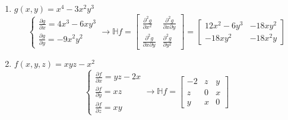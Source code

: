 \documentclass[12pt]{article}
\begin{document}
\begin{enumerate}
    \item $g(x,y) = x^4 -3x^2y^3$
    \[ \begin{cases}
        \frac{\partial g}{\partial x} = 4x^3 - 6xy^3
        \\ \frac{\partial g}{\partial y} = -9x^2y^2 
    \end{cases} \to \mathbb{H} f = \begin{bmatrix}
        \frac{\partial^2 g}{\partial x^2} & \frac{\partial^2 g}{\partial x\partial y} \\ \frac{\partial^2 g}{\partial x\partial y}& \frac{\partial^2 g}{\partial y^2}
    \end{bmatrix} = \begin{bmatrix}
        12x^2 -6y^3 & -18xy^2 \\ -18xy^2 & -18x^2y
    \end{bmatrix}
    \]
    \item $f(x,y,z) = xyz-x^2$
    \[ \begin{cases}
        \frac{\partial f }{\partial x} = yz - 2x
        \\ \frac{\partial f}{\partial y}=xz
        \\ \frac{\partial f}{\partial z} = xy
    \end{cases} \to \mathbb{H} f = \begin{bmatrix}
        -2 & z&y \\ z&0&x \\ y&x&0
    \end{bmatrix}\]
\end{enumerate}
\end{document}
